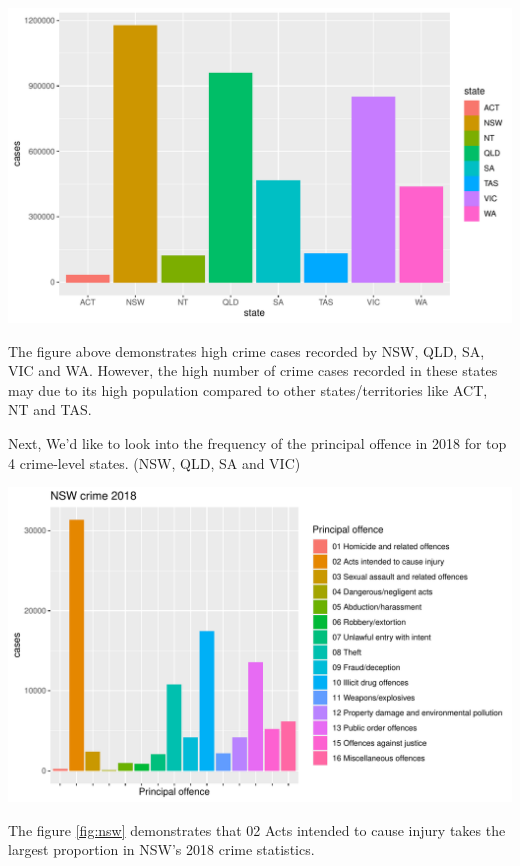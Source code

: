 \documentclass[11pt,a4paper,]{article}
\let\origfigure\figure
\let\endorigfigure\endfigure
\renewenvironment{figure}[1][2] {
\expandafter\origfigure\expandafter[H]
} {
\endorigfigure
}
\begin{document}
\begin{figure}
\centering
\includegraphics{ETC5513-Assignment4_files/figure-latex/graph1-1.pdf}
\caption{\label{fig:graph1}state-crime}
\end{figure}

The figure above demonstrates high crime cases recorded by NSW, QLD, SA, VIC and WA. However, the high number of crime cases recorded in these states may due to its high population compared to other states/territories like ACT, NT and TAS.

Next, We'd like to look into the frequency of the principal offence in 2018 for top 4 crime-level states. (NSW, QLD, SA and VIC)

\begin{figure}
\centering
\includegraphics{ETC5513-Assignment4_files/figure-latex/nsw-1.pdf}
\caption{\label{fig:nsw}NSW crime 2018}
\end{figure}

The figure \ref{fig:nsw} demonstrates that 02 Acts intended to cause injury takes the largest proportion in NSW's 2018 crime statistics.
\end{document}
